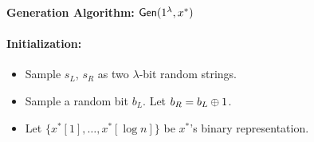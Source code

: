 \begin{figure}[p]
    \begin{minipage}{\textwidth}
        \begin{mdframed}
            \begin{center}
                \textbf{Generation Algorithm:} ${\sf Gen}(1^\lambda, x^*)$
            \end{center}
            
            \paragraph{Initialization:} 
            \begin{itemize}
                \item Sample $s_L$, $s_R$ as two $\lambda$-bit random strings. 
                \item Sample a random bit $b_L$. Let $b_R=b_L\oplus 1$. 
                \item Let $\{x^*[1],\dots,x^*[\log n]\}$ be $x^*$'s binary representation.
            \end{itemize}
            
            

\end{mdframed}
\end{minipage}
\end{figure}
